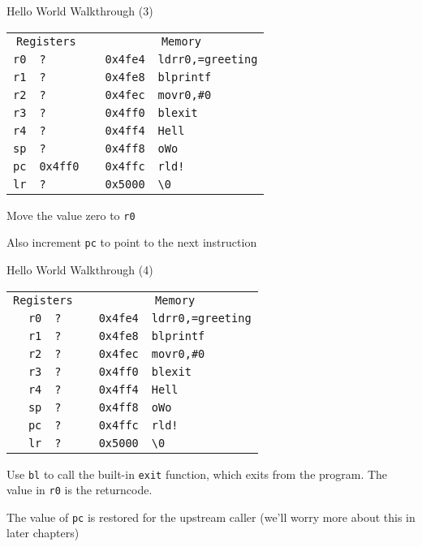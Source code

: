 \begin{frame}{Hello World Walkthrough (3)}
    \begin{alltt}
        \begin{tabular}{ r | l p{5mm} r | l }
            \multicolumn{2}{c}{Registers} && \multicolumn{2}{c}{Memory} \\
            r0 & ? && 0x4fe4 & ldr r0, =greeting \\
            r1 & ? && 0x4fe8 & bl printf \\
            r2 & ? && 0x4fec & mov r0, \#0 \\
            r3 & ? && 0x4ff0 & bl exit \\
            r4 & ? && 0x4ff4 & Hell \\
            sp & ? && 0x4ff8 & o Wo \\
            pc & 0x4ff0 && 0x4ffc & rld! \\
            lr & ? && 0x5000 & {\textbackslash}0 \\
            \end{tabular}
        \end{alltt}

        Move the value zero to \texttt{r0}

        Also increment \texttt{pc} to point to the next instruction


\end{frame}

\begin{frame}{Hello World Walkthrough (4)}
    \begin{alltt}
        \begin{tabular}{ r | l p{5mm} r | l }
            \multicolumn{2}{c}{Registers} && \multicolumn{2}{c}{Memory} \\
            r0 & ? && 0x4fe4 & ldr r0, =greeting \\
            r1 & ? && 0x4fe8 & bl printf \\
            r2 & ? && 0x4fec & mov r0, \#0 \\
            r3 & ? && 0x4ff0 & bl exit \\
            r4 & ? && 0x4ff4 & Hell \\
            sp & ? && 0x4ff8 & o Wo \\
            pc & ? && 0x4ffc & rld! \\
            lr & ? && 0x5000 & {\textbackslash}0 \\
            \end{tabular}
        \end{alltt}

    Use \texttt{bl} to call the built-in \texttt{exit} function, which exits from the program. The value in \texttt{r0} is the returncode.
    
    The value of \texttt{pc} is restored for the upstream caller (we'll worry more about this in later chapters)

\end{frame}
















